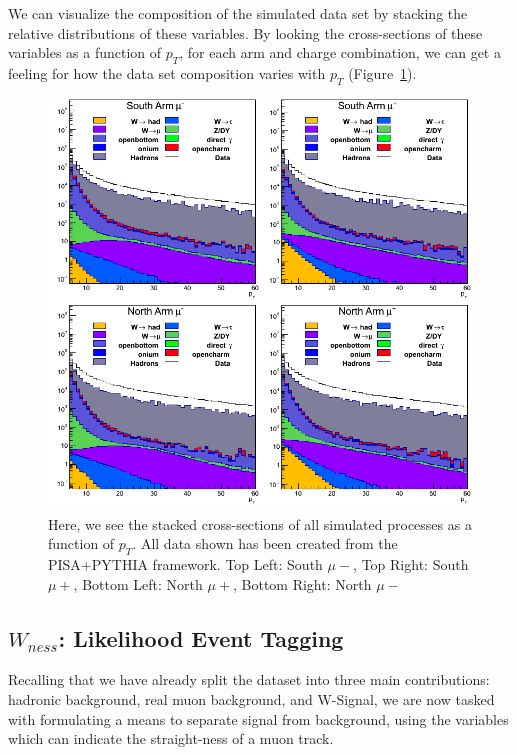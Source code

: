 We can visualize the composition of the simulated data set by stacking the
relative distributions of these variables. By looking the cross-sections of
these variables as a function of $p_T$, for each arm and charge combination, we
can get a feeling for how the data set composition varies with $p_T$
(Figure~\ref{fig:stacked_xsec_sim}).

\begin{figure}[ht]

  \includegraphics[width=\linewidth]{./figures/stacked_xsec.png}
  \caption{
    Here, we see the stacked cross-sections of all simulated processes as a
    function of $p_T$. All data shown has been created from the PISA+PYTHIA
    framework. Top Left: South $\mu-$, Top Right: South $\mu+$, Bottom Left:
    North $\mu+$, Bottom Right: North $\mu-$  ~\cite{Seidl2014}
  }
  \label{fig:stacked_xsec_sim}
\end{figure}

\clearpage


\subsection{$W_{ness}$: Likelihood Event Tagging}
\label{sec:likelihood}

Recalling that we have already split the dataset into three main contributions:
hadronic background, real muon background, and W-Signal, we are now tasked with
formulating a means to separate signal from background, using the variables
which can indicate the straight-ness of a muon track.

